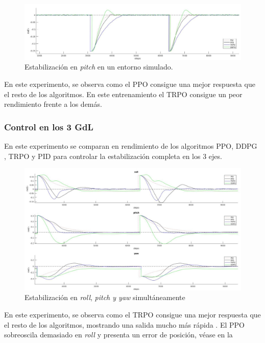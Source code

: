 \begin{figure}[htb!]
	\centering
	\includegraphics[width=\textwidth]{experimentos/sim_onlypitch}
	\caption{Estabilización en \textit{pitch} en un entorno simulado.}
	\label{mat_lab_graph}	
\end{figure}

En este experimento, se observa como el PPO consigue una mejor respuesta que el resto de los algoritmos. En este entrenamiento el TRPO consigue un peor rendimiento frente a los demás.


\subsubsection{Control en los 3 GdL}

En este experimento se comparan en rendimiento de los algoritmos PPO, DDPG , TRPO y PID para controlar la estabilización completa en los 3 ejes. 

\begin{figure}[htb!]
	\centering
	\includegraphics[width=0.9\textheight,angle=90]{experimentos/3_angles_real}
	\vspace{0.5cm}
	\caption{Estabilización en \textit{roll}, \textit{pitch y \textit{yaw}} simultáneamente}
	\label{Fig.7.2}	
\end{figure}

En este experimento, se observa como el TRPO consigue una mejor respuesta que el resto de los algoritmos, mostrando una salida mucho más rápida . El PPO sobreoscila demasiado en \textit{roll} y presenta un error de posición, véase en la 

